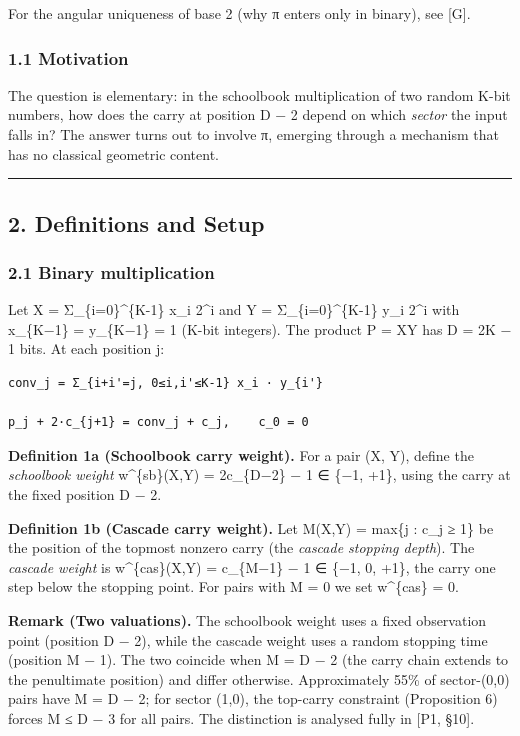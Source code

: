 \documentclass[
  11pt,
]{article}
\begin{document}
For the angular uniqueness of base 2 (why π enters only in binary), see {[}G{]}.

\subsubsection{1.1 Motivation}\label{motivation}

The question is elementary: in the schoolbook multiplication of two random K-bit
numbers, how does the carry at position D − 2 depend on which \emph{sector} the
input falls in? The answer turns out to involve π, emerging through a mechanism
that has no classical geometric content.

\begin{center}\rule{0.5\linewidth}{0.5pt}\end{center}

\newpage

\subsection{2. Definitions and Setup}\label{definitions-and-setup}

\subsubsection{2.1 Binary multiplication}\label{binary-multiplication}

Let X = Σ\_\{i=0\}\^{}\{K-1\} x\_i 2\^{}i and Y = Σ\_\{i=0\}\^{}\{K-1\} y\_i
2\^{}i with x\_\{K−1\} = y\_\{K−1\} = 1 (K-bit integers). The product P = XY has
D = 2K − 1 bits. At each position j:

\begin{verbatim}
conv_j = Σ_{i+i'=j, 0≤i,i'≤K-1} x_i · y_{i'}

p_j + 2·c_{j+1} = conv_j + c_j,    c_0 = 0
\end{verbatim}

\textbf{Definition 1a (Schoolbook carry weight).} For a pair (X, Y), define the
\emph{schoolbook weight} w\^{}\{sb\}(X,Y) = 2c\_\{D−2\} − 1 ∈ \{−1, +1\}, using
the carry at the fixed position D − 2.

\textbf{Definition 1b (Cascade carry weight).} Let M(X,Y) = max\{j : c\_j ≥ 1\}
be the position of the topmost nonzero carry (the \emph{cascade stopping
depth}). The \emph{cascade weight} is w\^{}\{cas\}(X,Y) = c\_\{M−1\} − 1 ∈ \{−1,
0, +1\}, the carry one step below the stopping point. For pairs with M = 0 we
set w\^{}\{cas\} = 0.

\textbf{Remark (Two valuations).} The schoolbook weight uses a fixed observation
point (position D − 2), while the cascade weight uses a random stopping time
(position M − 1). The two coincide when M = D − 2 (the carry chain extends to
the penultimate position) and differ otherwise. Approximately 55\% of
sector-(0,0) pairs have M = D − 2; for sector (1,0), the top-carry constraint
(Proposition 6) forces M ≤ D − 3 for all pairs. The distinction is analysed
fully in {[}P1, §10{]}.
\end{document}
